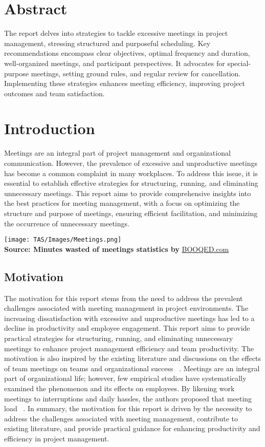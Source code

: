 \newpage
\section{Abstract}
    The report delves into strategies to tackle excessive meetings in project management, stressing structured and purposeful scheduling. Key recommendations encompass clear objectives, optimal frequency and duration, well-organized meetings, and participant perspectives. It advocates for special-purpose meetings, setting ground rules, and regular review for cancellation. Implementing these strategies enhances meeting efficiency, improving project outcomes and team satisfaction.
\section{Introduction}
Meetings are an integral part of project management and organizational communication. However, the prevalence of excessive and unproductive meetings has become a common complaint in many workplaces. To address this issue, it is essential to establish effective strategies for structuring, running, and eliminating unnecessary meetings. This report aims to provide comprehensive insights into the best practices for meeting management, with a focus on optimizing the structure and purpose of meetings, ensuring efficient facilitation, and minimizing the occurrence of unnecessary meetings.
\begin{center}
    \texttt{[image: TAS/Images/Meetings.png]}\\ 
    {\bfseries Source: Minutes wasted of meetings statistics by }\href{https://www.booqed.com/blog/minutes-wasted-of-meeting-50-shocking-meeting-statistics}{BOOQED.com}
\end{center}
\subsection{Motivation}
The motivation for this report stems from the need to address the prevalent challenges associated with meeting management in project environments. The increasing dissatisfaction with excessive and unproductive meetings has led to a decline in productivity and employee engagement. This report aims to provide practical strategies for structuring, running, and eliminating unnecessary meetings to enhance project management efficiency and team productivity. The motivation is also inspired by the existing literature and discussions on the effects of team meetings on teams and organizational success ~\cite{01}. Meetings are an integral part of organizational life; however, few empirical studies have systematically examined the phenomenon and its effects on employees. By likening work meetings to interruptions and daily hassles, the authors proposed that meeting load ~\cite{05}.
In summary, the motivation for this report is driven by the necessity to address the challenges associated with meeting management, contribute to existing literature, and provide practical guidance for enhancing productivity and efficiency in project management.
